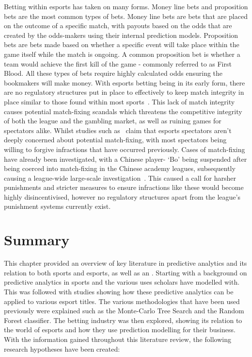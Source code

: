 Betting within esports has taken on many forms.
Money line bets and proposition bets are the most common types of bets.
Money line bets are bets that are placed on the outcome of a specific match, with payouts based on the odds that are created by the odds-makers using their internal prediction models.
Proposition bets are bets made based on whether a specific event will take place within the game itself while the match is ongoing.
A common proposition bet is whether a team would achieve the first kill of the game - commonly referred to as First Blood.
All these types of bets require highly calculated odds ensuring the bookmakers will make money.
With esports betting being in its early form, there are no regulatory structures put in place to effectively to keep match integrity in place similar to those found within most sports~\citep{dos2017q}.
This lack of match integrity causes potential match-fixing scandals which threatens the competitive integrity of both the league and the gambling market, as well as ruining games for spectators alike.
Whilst studies such as~\citet{abarbanel2019esports} claim that esports spectators aren't deeply concerned about potential match-fixing, with most spectators being willing to forgive infractions that have occurred previously.
Cases of match-fixing have already been investigated, with a Chinese player- `Bo' being suspended after being coerced into match-fixing in the Chinese academy leagues, subsequently causing a league-wide large-scale investigation~\citep{heath2021matchfixing}.
This caused a call for harsher punishments and stricter measures to ensure infractions like these would become highly disincentivised, however no regulatory structures apart from the league's punishment systems currently exist.\\

\section{Summary}\label{sec:Summary}
This chapter provided an overview of key literature in predictive analytics and its relation to both sports and esports, as well as an .
Starting with a background on predictive analytics in sports and the various uses scholars have modelled with.
This was followed with studies showing how these predictive analytics can be applied to various esport titles.
The various methodologies that have been used previously were explained such as the Monte-Carlo Tree Search and the Random Forest classifier.
The betting industry was then explored, showing its relation to the world of esports and how they use prediction modelling for their business.
With the information gained throughout this literature review, the following research hypotheses have been created:


